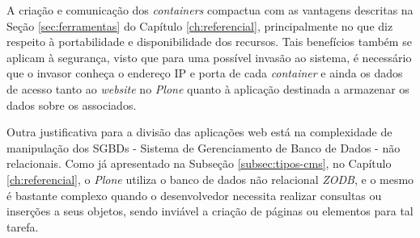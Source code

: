 A criação e comunicação dos \textit{containers} compactua com as vantagens descritas na Seção \ref{sec:ferramentas} do Capítulo \ref{ch:referencial}, principalmente no que diz respeito à portabilidade e disponibilidade dos recursos. Tais benefícios também se aplicam à segurança, visto que para uma possível invasão ao sistema, é necessário que o invasor conheça o endereço IP e porta de cada \textit{container} e ainda os dados de acesso tanto ao \textit{website} no \textit{Plone} quanto à aplicação destinada a armazenar os dados sobre os associados.   

Outra justificativa para a divisão das aplicações web está na complexidade de manipulação dos SGBDs - Sistema de Gerenciamento de Banco de Dados - não relacionais. Como já apresentado na Subseção \ref{subsec:tipos-cms}, no Capítulo \ref{ch:referencial}, o \textit{Plone} utiliza o banco de dados não relacional \textit{ZODB}, e o mesmo é bastante complexo quando o desenvolvedor necessita realizar consultas ou inserções a seus objetos, sendo inviável a criação de páginas ou elementos para tal tarefa.  

